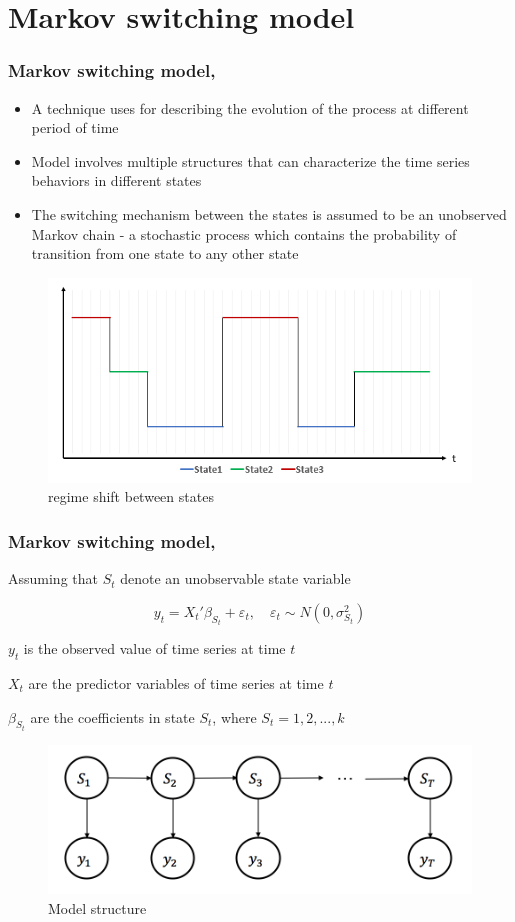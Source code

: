 \documentclass{beamer}
\begin{document}
\section{Markov switching model} %
\begin{frame}
	\frametitle{Markov switching model, \cite{p1}}
	\begin{itemize}
		\setlength\itemsep{1em}
		\item A technique uses for describing the evolution of the process at different period of time
		\item Model involves multiple structures that can characterize the time series behaviors in different states
		\item The switching mechanism between the states is assumed to be an unobserved Markov chain - \footnotesize{a stochastic process which contains the probability of transition from one state to any other state}
	\end{itemize}

\begin{figure}
	\includegraphics[width=0.5\linewidth]{graph3}
	\caption{regime shift between states}
\end{figure}

\end{frame}

\begin{frame}
\frametitle{Markov switching model, \cite{p1}}
Assuming that $S_{t}$ denote an unobservable state variable

$$y_{t} = {X_{t}}'\beta_{S_{t}} + \varepsilon_{t}, \quad \varepsilon_{t} \sim N(0,\sigma^{2}_{S_{t}})$$

$y_{t}$ is the observed value of time series at time $t$ 
\vspace{1mm}

$X_{t}$ are the predictor variables of time series at time $t$ 
\vspace{1mm}

$\beta_{S_{t}}$ are the coefficients in state $S_{t}$, where $S_{t}=1,2,...,k$


\begin{figure}
	\includegraphics[width=0.5\linewidth]{msm}
	\caption{Model structure}
\end{figure}

\end{frame}
\end{document}
